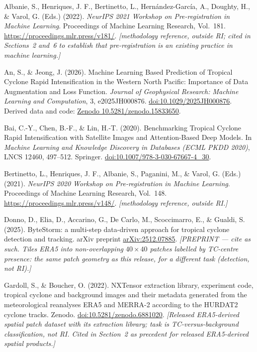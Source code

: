 \documentclass[11pt]{article}
\begin{document}
\begin{references}

\item Albanie, S., Henriques, J. F., Bertinetto, L., Hern\'andez-Garc\'ia,
A., Doughty, H., \& Varol, G. (Eds.) (2022). \emph{NeurIPS 2021 Workshop on
Pre-registration in Machine Learning}. Proceedings of Machine Learning
Research, Vol.~181. \url{https://proceedings.mlr.press/v181/}.
\emph{[methodology reference, outside RI; cited in Sections~2 and~6 to
establish that pre-registration is an existing practice in machine learning.]}

\item An, S., \& Jeong, J. (2026). Machine Learning Based Prediction of
Tropical Cyclone Rapid Intensification in the Western North Pacific:
Importance of Data Augmentation and Loss Function. \emph{Journal of
Geophysical Research: Machine Learning and Computation}, 3, e2025JH000876.
\href{https://doi.org/10.1029/2025JH000876}{doi:10.1029/2025JH000876}.
Derived data and code: \href{https://doi.org/10.5281/zenodo.15833650}%
{Zenodo 10.5281/zenodo.15833650}.

\item Bai, C.-Y., Chen, B.-F., \& Lin, H.-T. (2020). Benchmarking Tropical
Cyclone Rapid Intensification with Satellite Images and Attention-Based Deep
Models. In \emph{Machine Learning and Knowledge Discovery in Databases (ECML
PKDD 2020)}, LNCS 12460, 497--512. Springer.
\href{https://doi.org/10.1007/978-3-030-67667-4_30}%
{doi:10.1007/978-3-030-67667-4\_30}.

\item Bertinetto, L., Henriques, J. F., Albanie, S., Paganini, M., \& Varol, G.
(Eds.) (2021). \emph{NeurIPS 2020 Workshop on Pre-registration in Machine
Learning}. Proceedings of Machine Learning Research, Vol.~148.
\url{https://proceedings.mlr.press/v148/}.
\emph{[methodology reference, outside RI.]}

\item Donno, D., Elia, D., Accarino, G., De Carlo, M., Scoccimarro, E., \&
Gualdi, S. (2025). ByteStorm: a multi-step data-driven approach for tropical
cyclone detection and tracking. arXiv preprint
\href{https://arxiv.org/abs/2512.07885}{arXiv:2512.07885}.
\emph{[PREPRINT --- cite as such. Tiles ERA5 into non-overlapping
$40\times40$ patches labelled by TC-centre presence: the same patch geometry
as this release, for a different task (detection, not RI).]}

\item Gardoll, S., \& Boucher, O. (2022). NXTensor extraction library,
experiment code, tropical cyclone and background images and their metadata
generated from the meteorological reanalyses ERA5 and MERRA-2 according to the
HURDAT2 cyclone tracks. Zenodo.
\href{https://doi.org/10.5281/zenodo.6881020}{doi:10.5281/zenodo.6881020}.
\emph{[Released ERA5-derived spatial patch dataset with its extraction library;
task is TC-versus-background classification, not RI. Cited in Section~2 as
precedent for released ERA5-derived spatial products.]}


\end{references}
\end{document}
